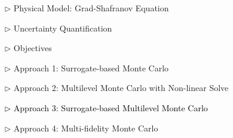 \documentclass{beamer}
\begin{document}
\begin{frame}[c]
\large 	
\textcolor{mygray1}{
    \begin{itemize}[leftmargin=5pt] 
        \item[$\triangleright$]  Physical Model: Grad-Shafranov Equation
        \vspace{0.2cm}	
        \item[$\triangleright$] Uncertainty Quantification
        \vspace{0.2cm}
        \item[$\triangleright$]  Objectives
        \vspace{0.2cm}
        \item[$\triangleright$]  Approach 1: Surrogate-based Monte Carlo
        \vspace{0.2cm}
        \item[$\triangleright$] Approach 2: Multilevel Monte Carlo with Non-linear Solve
        \vspace{0.2cm}
        \item[\textcolor{black}{$\triangleright$}] \textcolor{black}{\fontsize{25}{60}\selectfont Approach 3: Surrogate-based Multilevel Monte Carlo}
        \vspace{0.2cm}
        \item[$\triangleright$] Approach 4: Multi-fidelity Monte Carlo
    \end{itemize}
}
\end{frame}
\end{document}
